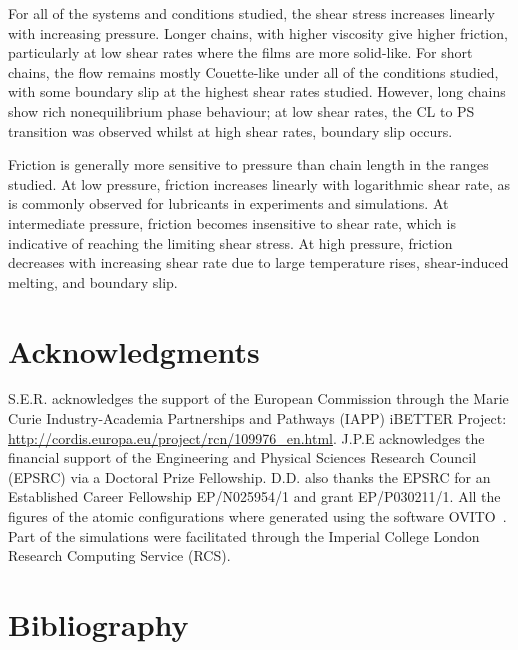 \documentclass[5p]{elsarticle}
\begin{document}
For all of the systems and conditions studied, the shear stress increases linearly with increasing pressure. Longer chains, with higher viscosity give higher friction, particularly at low shear rates where the films are more solid-like. For short chains, the flow remains mostly Couette-like under all of the conditions studied, with some boundary slip at the highest shear rates studied. However, long chains show rich nonequilibrium phase behaviour; at low shear rates, the CL to PS transition was observed whilst at high shear rates, boundary slip occurs.

Friction is generally more sensitive to pressure than chain length in the ranges studied. At low pressure, friction increases linearly with logarithmic shear rate, as is commonly observed for lubricants in experiments and simulations. At intermediate pressure, friction becomes insensitive to shear rate, which is indicative of reaching the limiting shear stress. At high pressure, friction decreases with increasing shear rate due to large temperature rises, shear-induced melting, and boundary slip.

\section*{Acknowledgments}

S.E.R. acknowledges the support of the European Commission through the Marie Curie Industry-Academia Partnerships and Pathways (IAPP) iBETTER Project: \url{http://cordis.europa.eu/project/rcn/109976_en.html}. J.P.E acknowledges the financial support of the Engineering and Physical Sciences Research Council (EPSRC) via a Doctoral Prize Fellowship. D.D. also thanks the EPSRC for an Established Career Fellowship EP/N025954/1 and grant EP/P030211/1. All the figures of the atomic configurations where generated using the software OVITO~\cite{Stukowski2010b}. Part of the simulations were facilitated through the Imperial College London Research Computing Service (RCS).


\section*{Bibliography}


%
%

\end{document}
